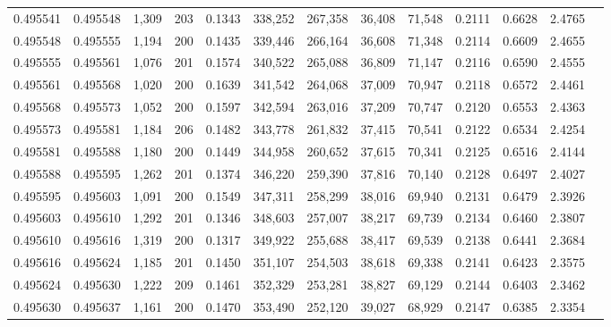 \begin{tabular}{rrrrrrrrrrrrr}
0.495541 & 0.495548 & 1,309 & 203 &                                     0.1343 & 338,252 & 267,358 &  36,408 &  71,548 & 0.2111 & 0.6628 & 2.4765 \\
0.495548 & 0.495555 & 1,194 & 200 &                                     0.1435 & 339,446 & 266,164 &  36,608 &  71,348 & 0.2114 & 0.6609 & 2.4655 \\
0.495555 & 0.495561 & 1,076 & 201 &                                     0.1574 & 340,522 & 265,088 &  36,809 &  71,147 & 0.2116 & 0.6590 & 2.4555 \\
0.495561 & 0.495568 & 1,020 & 200 &                                     0.1639 & 341,542 & 264,068 &  37,009 &  70,947 & 0.2118 & 0.6572 & 2.4461 \\
0.495568 & 0.495573 & 1,052 & 200 &                                     0.1597 & 342,594 & 263,016 &  37,209 &  70,747 & 0.2120 & 0.6553 & 2.4363 \\
0.495573 & 0.495581 & 1,184 & 206 &                                     0.1482 & 343,778 & 261,832 &  37,415 &  70,541 & 0.2122 & 0.6534 & 2.4254 \\
0.495581 & 0.495588 & 1,180 & 200 &                                     0.1449 & 344,958 & 260,652 &  37,615 &  70,341 & 0.2125 & 0.6516 & 2.4144 \\
0.495588 & 0.495595 & 1,262 & 201 &                                     0.1374 & 346,220 & 259,390 &  37,816 &  70,140 & 0.2128 & 0.6497 & 2.4027 \\
0.495595 & 0.495603 & 1,091 & 200 &                                     0.1549 & 347,311 & 258,299 &  38,016 &  69,940 & 0.2131 & 0.6479 & 2.3926 \\
0.495603 & 0.495610 & 1,292 & 201 &                                     0.1346 & 348,603 & 257,007 &  38,217 &  69,739 & 0.2134 & 0.6460 & 2.3807 \\
0.495610 & 0.495616 & 1,319 & 200 &                                     0.1317 & 349,922 & 255,688 &  38,417 &  69,539 & 0.2138 & 0.6441 & 2.3684 \\
0.495616 & 0.495624 & 1,185 & 201 &                                     0.1450 & 351,107 & 254,503 &  38,618 &  69,338 & 0.2141 & 0.6423 & 2.3575 \\
0.495624 & 0.495630 & 1,222 & 209 &                                     0.1461 & 352,329 & 253,281 &  38,827 &  69,129 & 0.2144 & 0.6403 & 2.3462 \\
0.495630 & 0.495637 & 1,161 & 200 &                                     0.1470 & 353,490 & 252,120 &  39,027 &  68,929 & 0.2147 & 0.6385 & 2.3354 \\

\end{tabular}
